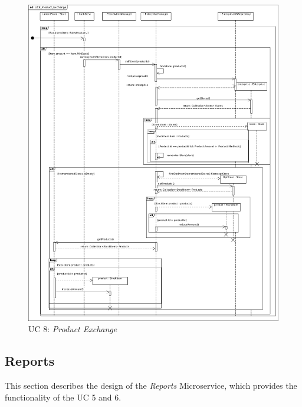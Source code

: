 			\begin{figure}[!h]
				\centering
				\includegraphics[width = 1\textwidth]{img/UC8_Product_Exchange.jpg}
				\caption{UC 8: \textit{Product Exchange}}
				\label{MS_UC8}
			\end{figure}
		\FloatBarrier	
		
		\subsection{Reports}
		This section describes the design of the \textit{Reports} Microservice, which provides the functionality of the UC 5 and 6.
		
